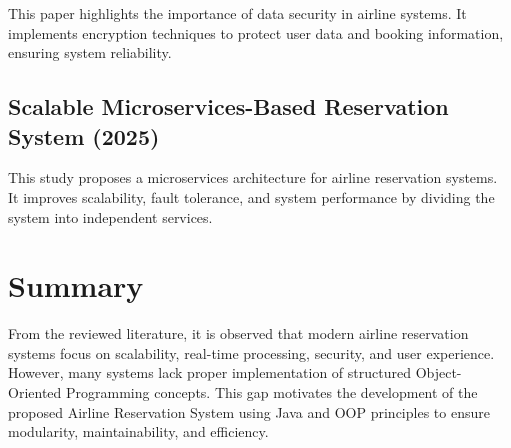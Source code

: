 This paper highlights the importance of data security in airline systems. It implements encryption techniques to protect user data and booking information, ensuring system reliability.

\subsection{Scalable Microservices-Based Reservation System (2025)}

This study proposes a microservices architecture for airline reservation systems. It improves scalability, fault tolerance, and system performance by dividing the system into independent services.

\section{Summary}

From the reviewed literature, it is observed that modern airline reservation systems focus on scalability, real-time processing, security, and user experience. However, many systems lack proper implementation of structured Object-Oriented Programming concepts. This gap motivates the development of the proposed Airline Reservation System using Java and OOP principles to ensure modularity, maintainability, and efficiency.